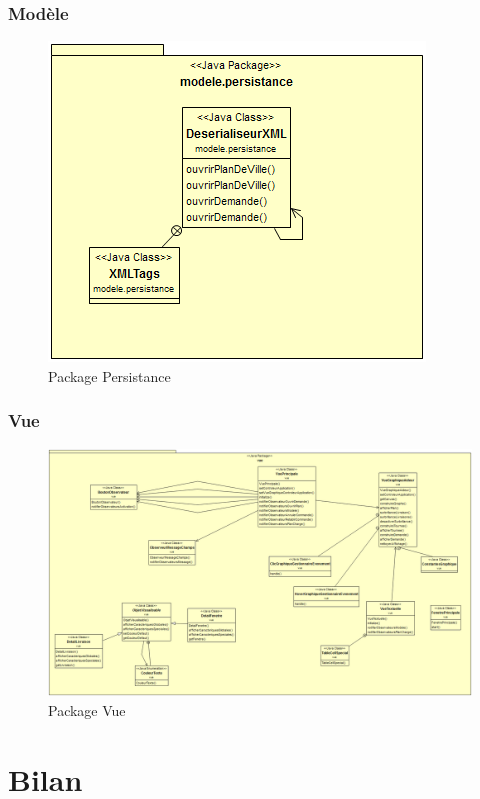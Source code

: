 \documentclass[10pt,a4paper]{book}
\begin{document}
\subsection{Modèle}
\begin{figure}[h!]
    \centering
    \includegraphics[scale=0.5]{DcPersistance.png}
    \caption{Package Persistance}
\end{figure}
\subsection{Vue}
\begin{figure}[h!]
    \centering
    \includegraphics[scale=0.33]{DcVue.png}
    \caption{Package Vue}
\end{figure}
\chapter{Bilan}
\end{document}
